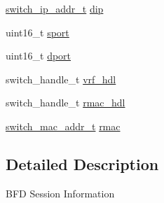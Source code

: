 \begin{DoxyCompactItemize}
\hyperlink{structswitch__ip__addr__s}{switch\+\_\+ip\+\_\+addr\+\_\+t} \hyperlink{structswitch__api__bfd__session__info_a61e43e2c51cb2c04fc7afc1a02f13c23}{dip}
\item 
uint16\+\_\+t \hyperlink{structswitch__api__bfd__session__info_a25987feaccc3974b3fa9c5112b514b85}{sport}
\item 
uint16\+\_\+t \hyperlink{structswitch__api__bfd__session__info_a1d971da85ae5ef61d99b241474a338d4}{dport}
\item 
switch\+\_\+handle\+\_\+t \hyperlink{structswitch__api__bfd__session__info_a44268bd41e465160f25d4bcd494550fa}{vrf\+\_\+hdl}
\item 
switch\+\_\+handle\+\_\+t \hyperlink{structswitch__api__bfd__session__info_af7034844ceb1ba50741e92cda885ad21}{rmac\+\_\+hdl}
\item 
\hyperlink{structswitch__mac__addr__s}{switch\+\_\+mac\+\_\+addr\+\_\+t} \hyperlink{structswitch__api__bfd__session__info_abca3afa004150873b183e7b36ddea805}{rmac}
\end{DoxyCompactItemize}


\subsection{Detailed Description}
B\+F\+D Session Information 

